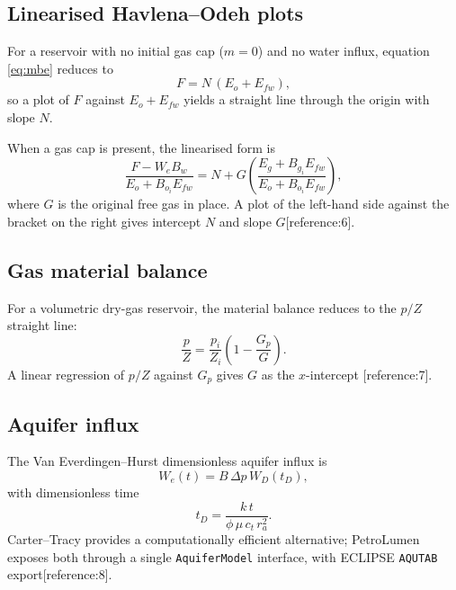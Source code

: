 \documentclass[10pt,a4paper]{article}
\newcommand{\bo}{B_o}
\newcommand{\bw}{B_w}
\newcommand{\bg}{B_g}
\begin{document}
\subsection{Linearised Havlena--Odeh plots}

For a reservoir with no initial gas cap ($m=0$) and no water influx, equation
\eqref{eq:mbe} reduces to
\begin{equation}
  F = N\,(E_o + E_{fw}),
  \label{eq:mbe-simple}
\end{equation}
so a plot of $F$ against $E_o+E_{fw}$ yields a straight line through the origin
with slope $N$.

When a gas cap is present, the linearised form is
\begin{equation}
  \frac{F - W_e\bw}{E_o + \bo_i E_{fw}}
  = N + G\left(\frac{E_g + \bg_i E_{fw}}{E_o + \bo_i E_{fw}}\right),
  \label{eq:havlena-odeh}
\end{equation}
where $G$ is the original free gas in place. A plot of the left-hand side
against the bracket on the right gives intercept $N$ and slope $G$[reference:6].

\subsection{Gas material balance}

For a volumetric dry-gas reservoir, the material balance reduces to the
$p/Z$ straight line:
\begin{equation}
  \frac{p}{Z} = \frac{p_i}{Z_i}\left(1 - \frac{G_p}{G}\right).
  \label{eq:pz}
\end{equation}
A linear regression of $p/Z$ against $G_p$ gives $G$ as the $x$-intercept
[reference:7].

\subsection{Aquifer influx}

The Van Everdingen--Hurst dimensionless aquifer influx is
\begin{equation}
  W_e(t) = B\,\Delta p\,W_D(t_D),
  \label{eq:veh}
\end{equation}
with dimensionless time
\begin{equation}
  t_D = \frac{k\,t}{\phi\,\mu\,c_t\,r_a^2}.
  \label{eq:td-aquifer}
\end{equation}
Carter--Tracy provides a computationally efficient alternative; PetroLumen
exposes both through a single \texttt{AquiferModel} interface, with
ECLIPSE \texttt{AQUTAB} export[reference:8].
\end{document}
